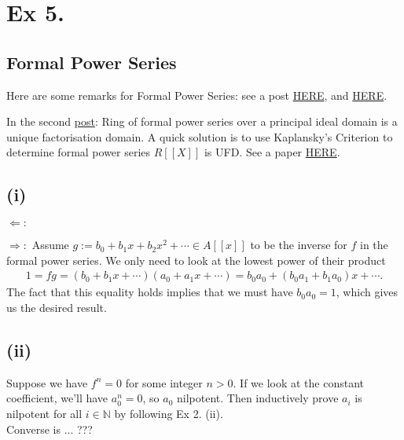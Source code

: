 \section{Ex 5.}

\subsection{Formal Power Series}

Here are some remarks for Formal Power Series: see a post \href{https://math.stackexchange.com/questions/1096521/ring-of-formal-power-series-over-a-principal-ideal-domain-is-a-unique-factorisat}{HERE}, and \href{https://math.stackexchange.com/questions/457447/if-r-is-an-integral-domain-then-rx-is-an-integral-domain}{HERE}.

In the second \href{https://math.stackexchange.com/questions/1096521/ring-of-formal-power-series-over-a-principal-ideal-domain-is-a-unique-factorisat}{post}: Ring of formal power series over a principal ideal domain is a unique factorisation domain. A quick solution is to use Kaplansky's Criterion to determine formal power series $R[[X]]$ is UFD. See a paper \href{https://people.brandeis.edu/~buchsbau/miscpapers/10052.pdf}{HERE}.

\subsection{(i)} 

$\Leftarrow:$ 

\noindent $\Rightarrow:$ Assume $g:=b_0+b_1x+b_2x^2+\cdots\in A[[x]]$ to be the inverse for $f$ in the formal power series.
We only need to look at the lowest power of their product
\begin{align*}
    1=fg=(b_0+b_1x+\cdots)(a_0+a_1x+\cdots)=b_0a_0+(b_0a_1+b_1a_0)x+\cdots.
\end{align*}The fact that this equality holds implies that we must have $b_0a_0=1$, which gives us the desired result.

\subsection{(ii)} Suppose we have $f^n=0$ for some integer $n>0$. If we look at the constant coefficient, we'll have $a_0^n=0$, so $a_0$ nilpotent. Then inductively prove $a_i$ is nilpotent for all $i\in \mathbb N$ by following Ex 2. (ii).\\

Converse is ... ???

